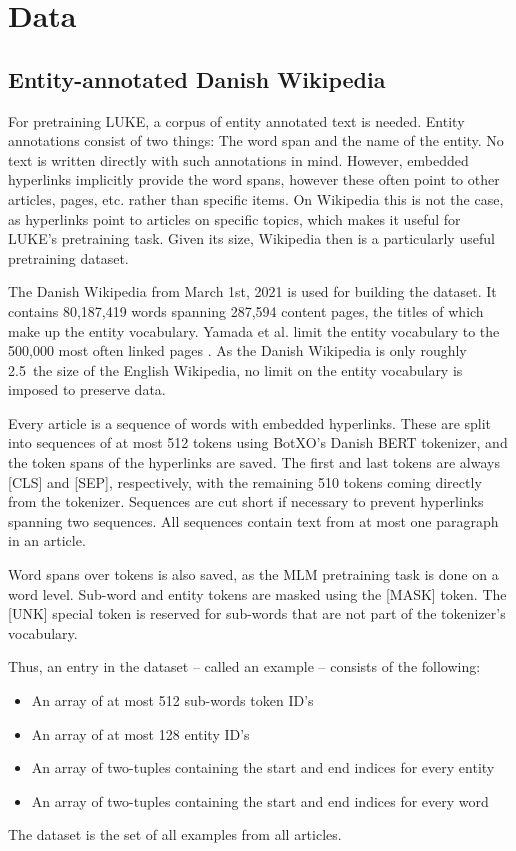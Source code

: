 \documentclass[main.tex]{subfiles}
\begin{document}
\chapter{Data}
\label{chap:data}

\section{Entity-annotated Danish Wikipedia}
\label{sec:dawiki}
For pretraining LUKE, a corpus of entity annotated text is needed.
Entity annotations consist of two things: The word span and the name of the entity.
No text is written directly with such annotations in mind.
However, embedded hyperlinks implicitly provide the word spans, however these often point to other articles, pages, etc. rather than specific items.
On Wikipedia this is not the case, as hyperlinks point to articles on specific topics, which makes it useful for LUKE's pretraining task.
Given its size, Wikipedia then is a particularly useful pretraining dataset.

The Danish Wikipedia from March 1st, 2021 is used for building the dataset.
It contains 80,187,419 words spanning 287,594 content pages, the titles of which make up the entity vocabulary.
Yamada et al. limit the entity vocabulary to the 500,000 most often linked pages \cite{yamada2020luke}.
As the Danish Wikipedia is only roughly 2.5\pro\ the size of the English Wikipedia, no limit on the entity vocabulary is imposed to preserve data.

Every article is a sequence of words with embedded hyperlinks.
These are split into sequences of at most 512 tokens using BotXO's Danish BERT tokenizer, and the token spans of the hyperlinks are saved.
The first and last tokens are always [CLS] and [SEP], respectively, with the remaining 510 tokens coming directly from the tokenizer.
Sequences are cut short if necessary to prevent hyperlinks spanning two sequences.
All sequences contain text from at most one paragraph in an article.

Word spans over tokens is also saved, as the MLM pretraining task is done on a word level.
Sub-word and entity tokens are masked using the [MASK] token.
The [UNK] special token is reserved for sub-words that are not part of the tokenizer's vocabulary.

Thus, an entry in the dataset -- called an example -- consists of the following:
\begin{itemize}
    \item An array of at most 512 sub-words token ID's
    \item An array of at most 128 entity ID's
    \item An array of two-tuples containing the start and end indices for every entity
    \item An array of two-tuples containing the start and end indices for every word
\end{itemize}
The dataset is the set of all examples from all articles.
\end{document}
